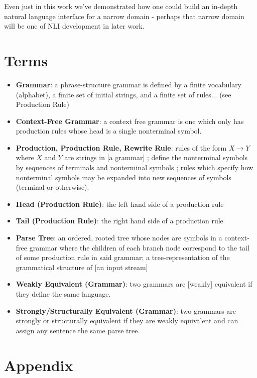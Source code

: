 \documentclass[11pt]{article}
\begin{document}
Even just in this work we've demonstrated how one could build an in-depth natural
language interface for a narrow domain - perhaps that narrow domain will be one of 
NLI development in later work.

\clearpage
\section*{Terms}

\begin{itemize}
\item \textbf{Grammar}: a phrase-structure grammar is defined by a finite vocabulary (alphabet), a finite set of
initial strings, and a finite set of rules... \cite{chomsky} (see Production Rule)
\item \textbf{Context-Free Grammar}: a context free grammar is one which only has production rules whose head is a single nonterminal symbol.
\cite{compiler, anatomy, formal_langs}
\item \textbf{Production, Production Rule, Rewrite Rule}: rules of the form $X \rightarrow Y$ where
$X$ and $Y$ are strings in [a grammar]  \cite{chomsky};
define the nonterminal symbols by sequences of terminals and nonterminal symbols \cite{compiler};
rules which specify how nonterminal symbols may be expanded into new sequences of symbols (terminal or otherwise).
\item \textbf{Head (Production Rule)}: the left hand side of a production rule
\item \textbf{Tail (Production Rule)}: the right hand side of a production rule
\item \textbf{Parse Tree}: an ordered, rooted tree whose nodes are symbols in a context-free grammar where the 
children of each branch node correspond to the tail of some production rule in said grammar;
a tree-representation of the grammatical structure of [an input stream] \cite{anatomy}
\item \textbf{Weakly Equivalent (Grammar)}: two grammars are [weakly] equivalent if they define the same language.\cite{reghizzi}
\item \textbf{Strongly/Structurally Equivalent (Grammar)}: two grammars are strongly or structurally equivalent
if they are weakly equivalent and can assign any sentence the same parse tree. \cite{reghizzi}
\end{itemize}

\clearpage
\section*{Appendix}
\end{document}
